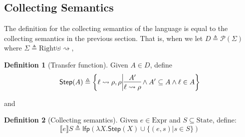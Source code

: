 \documentclass{article}
\theoremstyle{definition}
\newtheorem{definition}{Definition}[section]
\newcommand*{\pset}{\mathscr{P}}
\newcommand*{\Expr}{\text{Expr}}
\newcommand*{\Right}{\text{Right}}
\newcommand*{\State}{\text{State}}
\newcommand*{\lfp}{\mathsf{lfp}}
\newcommand*{\semarrow}{\rightsquigarrow}
\newcommand*{\sembracket}[1]{\lBrack{#1}\rBrack}
\begin{document}
\subsection{Collecting Semantics}
The definition for the collecting semantics of the language is equal to the collecting semantics in the previous section.
That is, when we let $D\triangleq\pset(\Sigma)$ where $\Sigma\triangleq\Right\uplus\semarrow$,
\begin{definition}[Transfer function]
  Given $A\in D$, define
  \[
    \mathsf{Step}(A)\triangleq
    \left\{\ell\semarrow\rho, \rho\middle|
    \begin{prooftree}[center=true]
      \hypo{A'}\infer1{\ell\semarrow\rho}
    \end{prooftree}\wedge
    A'\subseteq A\wedge\ell\in A
    \right\}
  \]
\end{definition}
and
\begin{definition}[Collecting semantics]
  Given $e\in\Expr$ and $S\subseteq\State$, define:
  \[
    \sembracket{e}S\triangleq\lfp(\lambda X.\mathsf{Step}(X)\cup\{(e,s)|s\in S\})
  \]
\end{definition}
\end{document}
